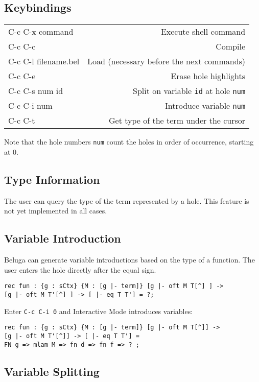 \documentclass[11pt]{article}
\begin{document}
\subsection{Keybindings}

\begin{tabular}{ l r }
C-c C-x command & Execute shell command \\
C-c C-c & Compile \\
C-c C-l filename.bel & Load (necessary before the next commands) \\
C-c C-e & Erase hole highlights \\
C-c C-s num id & Split on variable \verb+id+ at hole \verb+num+ \\
C-c C-i num & Introduce variable \verb+num+ \\
C-c C-t & Get type of the term under the cursor \\
\end{tabular}

Note that the hole numbers \verb+num+ count the holes in order of occurrence, starting at 0.

\subsection{Type Information}
The user can query the type of the term represented by a hole.
This feature is not yet implemented in all cases.

\subsection{Variable Introduction}
Beluga can generate variable introductions based on the type of a function.
The user enters the hole directly after the equal sign.
\begin{verbatim}
rec fun : {g : sCtx} {M : [g |- term]} [g |- oft M T[^] ] ->
[g |- oft M T'[^] ] -> [ |- eq T T'] = ?;
\end{verbatim}

Enter \verb+C-c C-i 0+ and Interactive Mode introduces variables:
\begin{verbatim}
rec fun : {g : sCtx} {M : [g |- term]} [g |- oft M T[^]] ->
[g |- oft M T'[^]] -> [ |- eq T T'] =
FN g => mlam M => fn d => fn f => ? ;
\end{verbatim}


\subsection{Variable Splitting}
\end{document}
